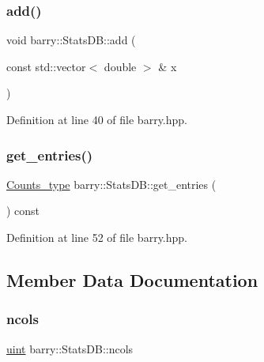 \subsubsection{\texorpdfstring{add()}{add()}}
{\footnotesize\ttfamily void barry\+::\+Stats\+D\+B\+::add (\begin{DoxyParamCaption}\item[{const std\+::vector$<$ double $>$ \&}]{x }\end{DoxyParamCaption})\hspace{0.3cm}{\ttfamily [inline]}}



Definition at line 40 of file barry.\+hpp.

\mbox{\label{classbarry_1_1_stats_d_b_a396e0921c34a854320a8027ce0f29278}} 
\subsubsection{\texorpdfstring{get\+\_\+entries()}{get\_entries()}}
{\footnotesize\ttfamily \hyperlink{namespacebarry_a3e2d8c3b6cf602107559d4237d9f1315}{Counts\+\_\+type} barry\+::\+Stats\+D\+B\+::get\+\_\+entries (\begin{DoxyParamCaption}{ }\end{DoxyParamCaption}) const\hspace{0.3cm}{\ttfamily [inline]}}



Definition at line 52 of file barry.\+hpp.



\subsection{Member Data Documentation}
\mbox{\label{classbarry_1_1_stats_d_b_a72aa06a48053cf79c4be7f821f83bd9b}} 
\subsubsection{\texorpdfstring{ncols}{ncols}}
{\footnotesize\ttfamily \hyperlink{namespacebarry_a11dfc53ddb4672278319aa04f1e09a6c}{uint} barry\+::\+Stats\+D\+B\+::ncols}



